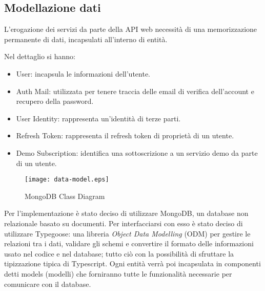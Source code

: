 \subsection{Modellazione dati}
L'erogazione dei servizi da parte della API web necessità di una memorizzazione permanente di dati, incapsulati all'interno di entità.

Nel dettaglio si hanno:
\begin{itemize}
    \itemsep0em
    \item User: incapsula le informazioni dell'utente.
    \item Auth Mail: utilizzata per tenere traccia delle email di verifica dell'account e recupero della password.
    \item User Identity: rappresenta un'identità di terze parti.
    \item Refresh Token: rappresenta il refresh token di proprietà di un utente.
    \item Demo Subscription: identifica una sottoscrizione a un servizio demo da parte di un utente.
\end{itemize}

\begin{figure}[h]
    \centering
    \texttt{[image: data-model.eps]}
    \caption{MongoDB Class Diagram}
    \label{fig:DataModel}
\end{figure}

Per l'implementazione è stato deciso di utilizzare MongoDB, un database non relazionale basato su documenti.
Per interfacciarsi con esso è stato deciso di utilizzare Typegoose\cite{Typegoose}: una libreria \textit{Object Data Modelling} (ODM) per gestire le relazioni tra i dati,
validare gli schemi e convertire il formato delle informazioni usato nel codice e nel database; tutto ciò con la possibilità di sfruttare la tipizzazione tipica di Typescript.
Ogni entità verrà poi incapsulata in componenti detti models (modelli) che forniranno tutte le funzionalità necessarie per comunicare con il database.
\newpage